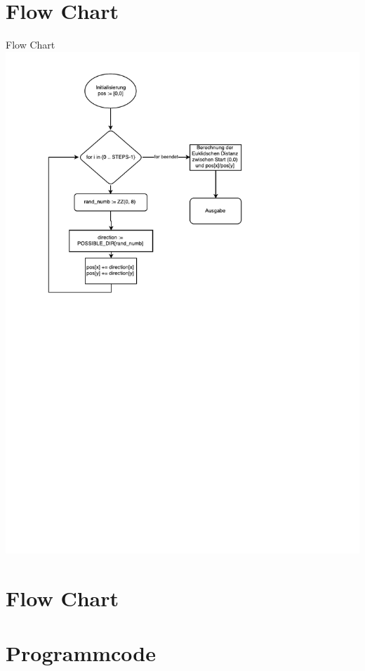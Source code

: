 \section{Flow Chart}
\begin{frame}{Flow Chart}
	\centering
  	\includegraphics[scale=0.5]{BSP07_Flow_Chart.pdf}
\end{frame}
\section{Flow Chart}

\section{Programmcode}
